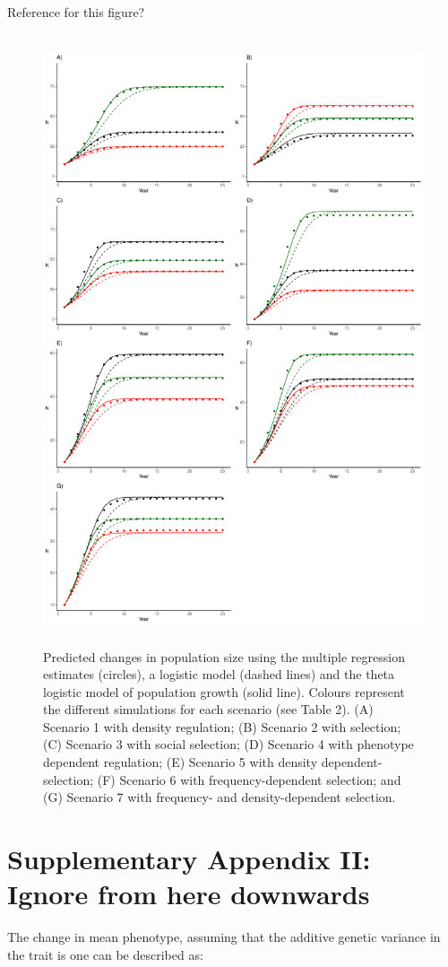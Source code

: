\documentclass{article}
\begin{document}
 Reference for this figure?
 \begin{figure}[H] 
 	\centering
 	\includegraphics[width=12cm, height=18cm]{Figures/FigS4.pdf}
 	\caption{Predicted changes in population size using the multiple regression estimates (circles), a logistic model (dashed lines) and the theta logistic model of population growth (solid line). Colours represent the different simulations for each scenario (see Table 2). (A) Scenario 1 with density regulation; (B) Scenario 2 with selection; (C) Scenario 3 with social selection; (D) Scenario 4 with phenotype dependent regulation; (E) Scenario 5 with density dependent-selection; (F) Scenario 6 with frequency-dependent selection; and (G) Scenario 7 with frequency- and density-dependent selection.} 
 	\label{fig:growth}
 \end{figure}
 
 \section{Supplementary Appendix II: Ignore from here downwards}
The change in mean phenotype, assuming that the additive genetic variance in the trait is one can be described as:
 
\end{document}
